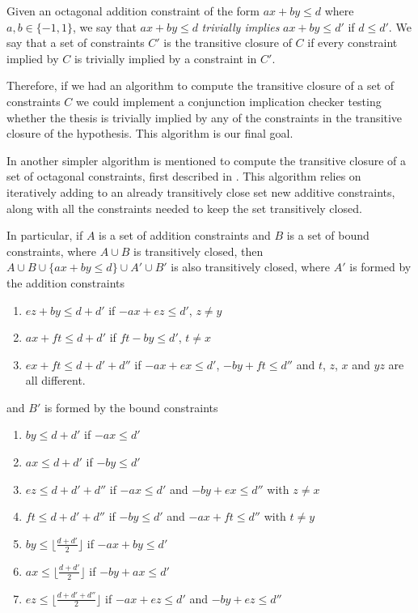 Given an octagonal addition constraint of the form $ax + by\le d$ where $a,b\in
\{-1,1\}$, we say that $ax + by \le d$ \emph{trivially implies} $ax + by \le d'$
if $d \le d'$. We say that a set of constraints $C'$ is the transitive closure of
$C$ if every constraint implied by $C$ is trivially implied by a constraint in 
$C'$.

Therefore, if we had an algorithm to compute the transitive closure of a set of
constraints $C$ we could implement a conjunction implication checker testing
whether the thesis is trivially implied by any of the constraints in the 
transitive closure of the hypothesis. This algorithm is our final goal.

In \cite{TransitiveClosure} another simpler algorithm is mentioned to compute the
transitive closure of a set of octagonal constraints, first described in 
\cite{HarveyStuckey}. This algorithm relies on iteratively adding to an already 
transitively close set new additive constraints, along with all the constraints needed
to keep the set transitively closed.

In particular, if $A$ is a set of addition constraints and $B$ is a set of bound 
constraints, where $A \cup B$ is transitively closed, then 
${A \cup B \cup \{ax+by \le d\} \cup A' \cup B'}$ is also transitively closed, where
$A'$ is formed by the addition constraints
\begin{enumerate}[label={\small \boxed{\textbf{A{\arabic*}}}}]
    \item\label{rule:A1} $ez + by \le d + d'$ if $-ax + ez \le d'$, $z \ne y$
    \item\label{rule:A2} $ax + ft \le d + d'$ if $ft - by \le d'$, $t \ne x$
    \item\label{rule:A3} $ex + ft \le d + d' + d''$ if $-ax + ex \le d'$, $-by + ft \le d''$ and $t$, $z$, $x$ and $yz$ are all different.
\end{enumerate}

\noindent and $B'$ is formed by the bound constraints

\begin{enumerate}[label={\small \boxed{\textbf{B{\arabic*}}}}]
    \item\label{rule:B1} $by \le d + d'$ if $-ax \le d'$
    \item\label{rule:B2} $ax \le d + d'$ if $-by \le d'$
    \item\label{rule:B3} $ez \le d + d' + d''$ if $-ax \le d'$ and $-by + ex \le d''$ with $z \ne x$
    \item\label{rule:B4} $ft \le d + d' + d''$ if $-by \le d'$ and $-ax + ft \le d''$ with $t \ne y$
    \item\label{rule:B5} $by \le \lfloor \frac{d + d'}{2}\rfloor$ if $-ax + by \le d'$
    \item\label{rule:B6} $ax \le \lfloor \frac{d + d'}{2}\rfloor$ if $-by + ax \le d'$
    \item\label{rule:B7} $ez \le \lfloor \frac{d + d' + d''}{2}\rfloor$ if $-ax + ez \le d'$ and $-by + ez \le d''$
\end{enumerate}

